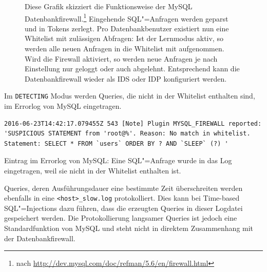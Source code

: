 \begin{figure}[ht!]
\begin{margincap}
\begin{tikzpicture}[node distance = 1.5cm, every node/.style={draw=white, align=center, text centered, draw=white, font=\footnotesize\sffamily,fill=documentColor!80, text=white,inner sep=5pt,minimum width=3cm}]
\end{tikzpicture}

\caption[Ablaufdiagramm der MySQL Enterprise Datenbankfirewall]{Diese Grafik skizziert die Funktionsweise der MySQL Datenbankfirewall.\footnote{\minipagefootnotefix \RaggedRight nach \url{http://dev.mysql.com/doc/refman/5.6/en/firewall.html}} Eingehende SQL"=Anfragen werden geparst und in Tokens zerlegt. Pro Datenbankbenutzer existiert nun eine Whitelist mit zulässigen Abfragen: Ist der Lernmodus aktiv, so werden alle neuen Anfragen in die Whitelist mit aufgenommen. Wird die Firewall aktiviert, so werden neue Anfragen je nach Einstellung nur geloggt oder auch abgelehnt. Entsprechend kann die Datenbankfirewall wieder als IDS oder IDP konfiguriert werden. }
\label{img:db_firewall}
\end{margincap}
\end{figure}





Im \texttt{DETECTING} Modus werden Queries, die nicht in der Whitelist enthalten sind, im Errorlog von MySQL eingetragen.
\begin{listing}[ht!]
\begin{margincap}

\begin{verbatim}
2016-06-23T14:42:17.079455Z 543 [Note] Plugin MYSQL_FIREWALL reported: 'SUSPICIOUS STATEMENT from 'root@%'. Reason: No match in whitelist.
Statement: SELECT * FROM `users` ORDER BY ? AND `SLEEP` (?) '
\end{verbatim}
\caption[ Errorlog von MySQL]{Eintrag im Errorlog von MySQL: Eine SQL"=Anfrage wurde in das Log eingetragen, weil sie nicht in der Whitelist enthalten ist.}
\end{margincap}
\end{listing}




Queries, deren Ausführungsdauer eine bestimmte Zeit überschreiten  werden ebenfalls in eine \texttt{<host>\_slow.log} protokolliert. Dies kann bei Time-based SQL"=Injections dazu führen, dass die erzeugten Queries in dieser Logdatei gespeichert werden. Die Protokollierung langsamer Queries ist jedoch eine Standardfunktion von MySQL und steht nicht in direktem Zusammenhang mit der Datenbankfirewall.



